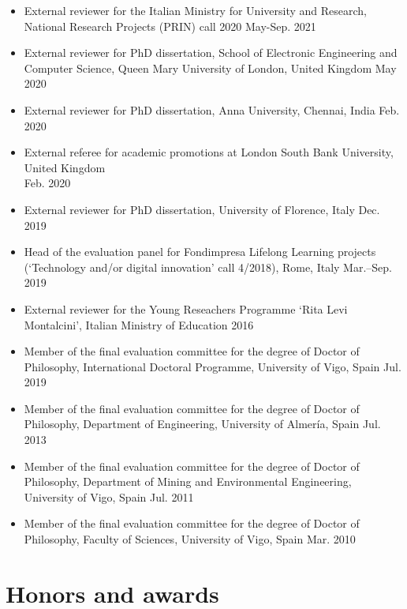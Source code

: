\documentclass[11pt]{article}
\begin{document}
\begin{itemize}
    \item External reviewer for the Italian Ministry for University and Research, National Research Projects (PRIN) call 2020 \hfill May-Sep. 2021
    \item External reviewer for PhD dissertation, School of Electronic Engineering and Computer Science, Queen Mary University of London, United Kingdom \hfill May 2020
    \item External reviewer for PhD dissertation, Anna University, Chennai, India \hfill Feb. 2020
    \item External referee for academic promotions at London South Bank University, United Kingdom \\ \mbox{} \hfill Feb. 2020
    \item External reviewer for PhD dissertation, University of Florence, Italy \hfill Dec. 2019
    \item Head of the evaluation panel for Fondimpresa Lifelong Learning projects (`Technology and/or digital innovation' call 4/2018), Rome, Italy \hfill Mar.--Sep. 2019
    \item External reviewer for the Young Reseachers Programme ‘Rita Levi Montalcini’, Italian Ministry of Education \hfill 2016
    \item Member of the final evaluation committee for the degree of Doctor of Philosophy, International Doctoral Programme, University of Vigo, Spain \hfill Jul. 2019
    \item Member of the final evaluation committee for the degree of Doctor of Philosophy, Department of Engineering, University of Almería, Spain \hfill Jul. 2013
    \item Member of the final evaluation committee for the degree of Doctor of Philosophy, Department of Mining and Environmental Engineering, University of Vigo, Spain \hfill Jul. 2011
    \item Member of the final evaluation committee for the degree of Doctor of Philosophy, Faculty of Sciences, University of Vigo, Spain \hfill Mar. 2010 
\end{itemize}

\section*{Honors and awards}
\end{document}
